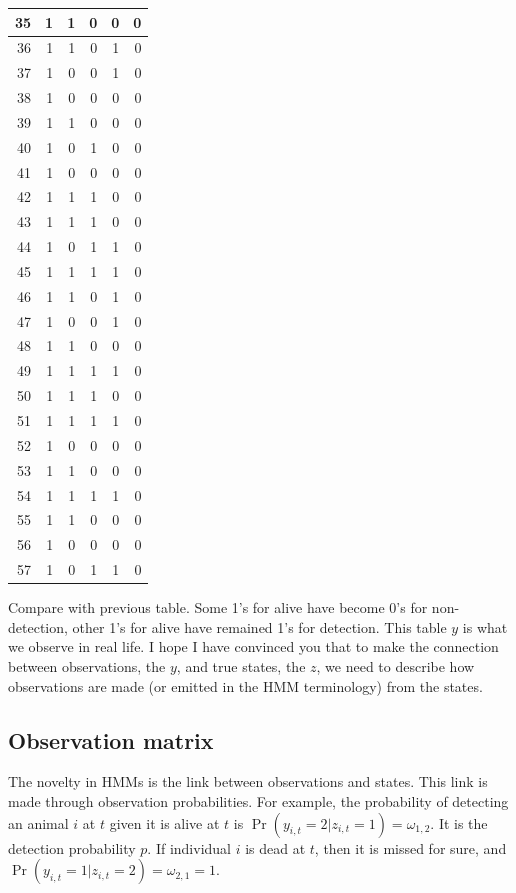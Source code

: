 \documentclass[
  12pt,
]{krantz}
\begin{document}
\begin{tabular}{r|r|r|r|r|r}
\hline
35 & 1 & 1 & 0 & 0 & 0\\
\hline
36 & 1 & 1 & 0 & 1 & 0\\
\hline
37 & 1 & 0 & 0 & 1 & 0\\
\hline
38 & 1 & 0 & 0 & 0 & 0\\
\hline
39 & 1 & 1 & 0 & 0 & 0\\
\hline
40 & 1 & 0 & 1 & 0 & 0\\
\hline
41 & 1 & 0 & 0 & 0 & 0\\
\hline
42 & 1 & 1 & 1 & 0 & 0\\
\hline
43 & 1 & 1 & 1 & 0 & 0\\
\hline
44 & 1 & 0 & 1 & 1 & 0\\
\hline
45 & 1 & 1 & 1 & 1 & 0\\
\hline
46 & 1 & 1 & 0 & 1 & 0\\
\hline
47 & 1 & 0 & 0 & 1 & 0\\
\hline
48 & 1 & 1 & 0 & 0 & 0\\
\hline
49 & 1 & 1 & 1 & 1 & 0\\
\hline
50 & 1 & 1 & 1 & 0 & 0\\
\hline
51 & 1 & 1 & 1 & 1 & 0\\
\hline
52 & 1 & 0 & 0 & 0 & 0\\
\hline
53 & 1 & 1 & 0 & 0 & 0\\
\hline
54 & 1 & 1 & 1 & 1 & 0\\
\hline
55 & 1 & 1 & 0 & 0 & 0\\
\hline
56 & 1 & 0 & 0 & 0 & 0\\
\hline
57 & 1 & 0 & 1 & 1 & 0\\
\hline
\end{tabular}

Compare with previous table. Some 1's for alive have become 0's for non-detection, other 1's for alive have remained 1's for detection. This table \(y\) is what we observe in real life. I hope I have convinced you that to make the connection between observations, the \(y\), and true states, the \(z\), we need to describe how observations are made (or emitted in the HMM terminology) from the states.

\hypertarget{observation-matrix}{%
\subsection{Observation matrix}\label{observation-matrix}}

The novelty in HMMs is the link between observations and states. This link is made through observation probabilities. For example, the probability of detecting an animal \(i\) at \(t\) given it is alive at \(t\) is \(\Pr(y_{i,t}=2|z_{i,t}=1)=\omega_{1,2}\). It is the detection probability \(p\). If individual \(i\) is dead at \(t\), then it is missed for sure, and \(\Pr(y_{i,t}=1|z_{i,t}=2)=\omega_{2,1}=1\).
\end{document}
